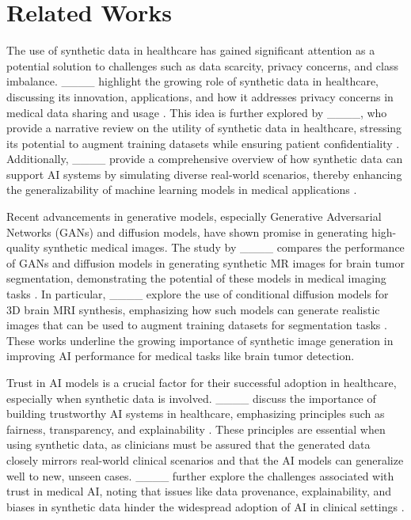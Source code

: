 \section{Related Works}
The use of synthetic data in healthcare has gained significant attention as a potential solution to challenges such as data scarcity, privacy concerns, and class imbalance. ____ highlight the growing role of synthetic data in healthcare, discussing its innovation, applications, and how it addresses privacy concerns in medical data sharing and usage . This idea is further explored by ____, who provide a narrative review on the utility of synthetic data in healthcare, stressing its potential to augment training datasets while ensuring patient confidentiality . Additionally, ____ provide a comprehensive overview of how synthetic data can support AI systems by simulating diverse real-world scenarios, thereby enhancing the generalizability of machine learning models in medical applications .

Recent advancements in generative models, especially Generative Adversarial Networks (GANs) and diffusion models, have shown promise in generating high-quality synthetic medical images. The study by ____ compares the performance of GANs and diffusion models in generating synthetic MR images for brain tumor segmentation, demonstrating the potential of these models in medical imaging tasks . In particular, ____ explore the use of conditional diffusion models for 3D brain MRI synthesis, emphasizing how such models can generate realistic images that can be used to augment training datasets for segmentation tasks . These works underline the growing importance of synthetic image generation in improving AI performance for medical tasks like brain tumor detection.

Trust in AI models is a crucial factor for their successful adoption in healthcare, especially when synthetic data is involved. ____ discuss the importance of building trustworthy AI systems in healthcare, emphasizing principles such as fairness, transparency, and explainability . These principles are essential when using synthetic data, as clinicians must be assured that the generated data closely mirrors real-world clinical scenarios and that the AI models can generalize well to new, unseen cases. ____ further explore the challenges associated with trust in medical AI, noting that issues like data provenance, explainability, and biases in synthetic data hinder the widespread adoption of AI in clinical settings .

